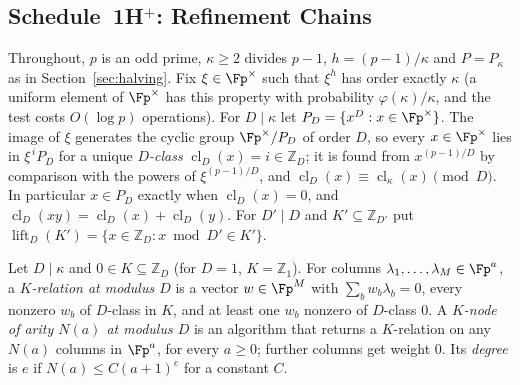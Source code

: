 
\subsection{Schedule~1H$^+$: Refinement Chains}
\label{sec:chains}

Throughout, $p$ is an odd prime, $\kappa \ge 2$ divides $p-1$, $h = (p-1)/\kappa$ and $P = P_\kappa$ as in Section~\ref{sec:halving}. Fix $\xi \in \Fp^\times$ such that $\xi^h$ has order exactly $\kappa$ (a uniform element of $\Fp^\times$ has this property with probability $\varphi(\kappa)/\kappa$, and the test costs $O(\log p)$ operations). For $D \mid \kappa$ let $P_D = \{x^D : x \in \Fp^\times\}$. The image of $\xi$ generates the cyclic group $\Fp^\times/P_D$ of order $D$, so every $x \in \Fp^\times$ lies in $\xi^{\,i}P_D$ for a unique \emph{$D$-class} $\operatorname{cl}_D(x) = i \in \mathbb{Z}_D$; it is found from $x^{(p-1)/D}$ by comparison with the powers of $\xi^{(p-1)/D}$, and $\operatorname{cl}_D(x) \equiv \operatorname{cl}_\kappa(x) \pmod D$. In particular $x \in P_D$ exactly when $\operatorname{cl}_D(x) = 0$, and $\operatorname{cl}_D(xy) = \operatorname{cl}_D(x) + \operatorname{cl}_D(y)$. For $D' \mid D$ and $K' \subseteq \mathbb{Z}_{D'}$ put $\operatorname{lift}_D(K') = \{x \in \mathbb{Z}_D : x \bmod D' \in K'\}$.

\begin{definition}
\label{def:k-node}
Let $D \mid \kappa$ and $0 \in K \subseteq \mathbb{Z}_D$ (for $D = 1$, $K = \mathbb{Z}_1$). For columns $\lambda_1,\dots,\lambda_M \in \Fp^a$, a \emph{$K$-relation at modulus $D$} is a vector $w \in \Fp^M$ with $\sum_b w_b\lambda_b = 0$, every nonzero $w_b$ of $D$-class in $K$, and at least one $w_b$ nonzero of $D$-class $0$. A \emph{$K$-node of arity $N(a)$ at modulus $D$} is an algorithm that returns a $K$-relation on any $N(a)$ columns in $\Fp^a$, for every $a \ge 0$; further columns get weight $0$. Its \emph{degree} is $e$ if $N(a) \le C(a+1)^e$ for a constant $C$.
\end{definition}

